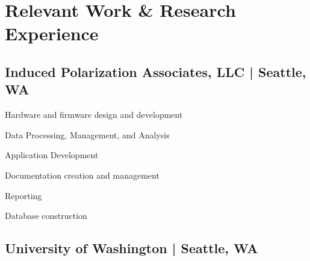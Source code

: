 \documentclass[letterpaper]{deedy-resume} %
\begin{document}
\begin{minipage}[t]{0.65\textwidth} %


\section{Relevant Work \& Research Experience}

\subsection{Induced Polarization Associates, LLC | Seattle, WA}
\vspace{\topsep} %
\begin{tightitemize}
\item Hardware and firmware design and development
\item Data Processing, Management, and Analysis
\item Application Development
\item Documentation creation and management
\item Reporting
\item Database construction
\end{tightitemize}
\sectionspace 

\subsection{University of Washington | Seattle, WA}


\end{minipage}
\end{document}

